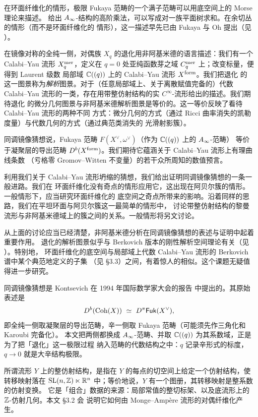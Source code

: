 在环面纤维化的情形，极限 Fukaya 范畴的一个满子范畴可以用底空间上的 Morse 理论来描述。
给出 $A_{\infty}$-结构的高阶乘法，可以写成对一族平面树求和。在余切丛的情形（而不是环面纤维化的
情形），这一描述早先已由 Fukaya 与 Oh 提出（见 \cite{FuO}）。

在镜像对称的全纯一侧，对偶族 $X_q$ 的退化用非阿基米德的语言描述：我们有一个 Calabi--Yau
流形 $X^{\mathrm{mer}}_{q}$，定义在 $q=0$ 处亚纯函数芽之域 $C^{\mathrm{mer}}_{q}$ 上；改变标量，便得到 Laurent 级数
局部域 $\mathbb{C}((q))$ 上的 Calabi--Yau 流形 $X^{\mathrm{form}}$。我们把退化
的这一图景称为\emph{解析}图景。对于（任意局部域上、关于离散赋值完备的）代数 Calabi--Yau
流形的一类，存在用带整仿射结构的实 $C^{\infty}$-流形给出的描述。我们期待退化
的微分几何图景与非阿基米德解析图景是等价的。这一等价反映了看待 Calabi--Yau 流形的两种不同
方式：微分几何的方式（通过 Ricci 曲率消失的凯勒度量）与代数几何的方式（通过典范类消失的
光滑射影簇）。

同调镜像猜想说，Fukaya 范畴 $F(X^{\vee},\omega^{\vee})$（作为 $\mathbb{C}((q))$ 上的 $A_{\infty}$-范畴）
等价于凝聚层的导出范畴 $D^b(X^{\mathrm{form}})$。我们期待它蕴涵关于 Calabi--Yau 流形上有理曲线条数
（亏格零 Gromov--Witten 不变量）的若干众所周知的数值预言。

利用我们关于 Calabi--Yau 流形坍缩的猜想，我们给出证明同调镜像猜想的一条一般进路。我们在
环面纤维化没有奇点的情形应用它，这出现在阿贝尔簇的情形。一般情形下，应当研究环面纤维化的
底空间之奇点所带来的影响。沿着同样的思路，我们在平坦环面与阿贝尔簇这一最简单的情形中，
讨论带整仿射结构的黎曼流形与非阿基米德域上的簇之间的关系。一般情形将另文讨论。

从上面的讨论应当已经清楚，非阿基米德分析在同调镜像猜想的表述与证明中起着重要作用。
退化的解析图景似乎与 Berkovich 版本的刚性解析空间理论有关（见 \cite{Be}）。特别地，
环面纤维化的底空间与局部域上代数 Calabi--Yau 流形的 Berkovich 谱中某个典范地定义的子集
（见 \S3.3）之间，有着惊人的相似。这个课题无疑值得进一步研究。

\begin{yizhu}[同调镜像猜想的出处]
同调镜像猜想是 Kontsevich 在 1994 年国际数学家大会的报告 \cite{Ko} 中提出的。其原始表述是
\[
  D^b(\Coh(X))\ \simeq\ D^{\pi}\Fuk(X^{\vee}),
\]
即全纯一侧取凝聚层的导出范畴，辛一侧取 Fukaya 范畴（可能须先作三角化和 Karoubi 完备化）。
本文把两侧都换成 $A_{\infty}$-范畴、并取 $\mathbb{C}((q))$ 为其系数域，正是为了把「退化」这一极限过程
纳入范畴的代数结构之中：$q$ 记录辛形式的标度，$q\to 0$ 就是大辛结构极限。
\end{yizhu}

\begin{yizhu}[整仿射结构]
所谓流形 $Y$ 上的整仿射结构，是指在 $Y$ 的每点的切空间上给定一个仿射结构，使转移映射落在
$\mathrm{SL}(n,\mathbb{Z})\ltimes \mathbb{R}^n$ 中；等价地说，$Y$ 有一个图册，其转移映射是整系数的仿射变换。
它是「组合」数据的来源：局部常值的整切标架、以及底流形上的 $\mathbb{Z}$-仿射几何。本文 \S3.2 会
说明它如何由 Monge--Ampère 流形的对偶纤维化产生。
\end{yizhu}

